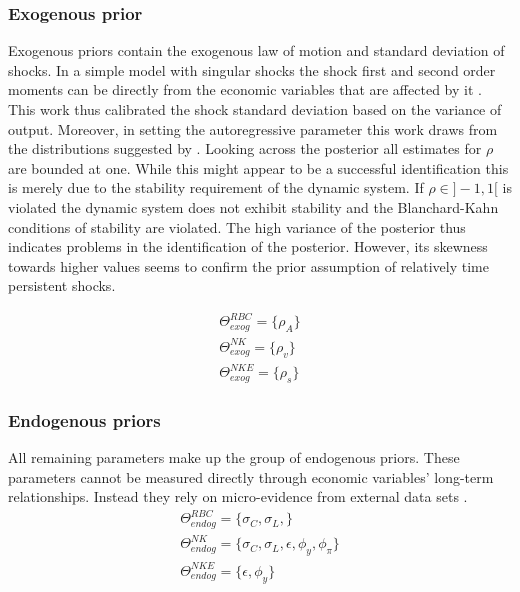 \documentclass[12pt,a4paper,english]{article} %
\begin{document}
	\subsubsection{Exogenous prior}
	Exogenous priors contain the exogenous law of motion and standard deviation of shocks. In a simple model with singular shocks the shock first and second order moments can be directly from the economic variables that are affected by it \cite{del_negro_forming_2008}. This work thus calibrated the shock standard deviation based on the variance of output. Moreover, in setting the autoregressive parameter this work draws from the distributions suggested by \cite{vasconez_what_nodate}. Looking across the posterior all estimates for $\rho$ are bounded at one. While this might appear to be a successful identification this is merely due to the stability requirement of the dynamic system. If $\rho \in ]-1,1[$ is violated the dynamic system does not exhibit stability and the Blanchard-Kahn conditions of stability are violated. The high variance of the posterior thus indicates problems in the identification of the posterior. However, its skewness towards higher values seems to confirm the prior assumption of relatively time persistent shocks. 
	
	\begin{equation}
		\begin{aligned}
			\Theta_{exog}^{RBC} = \{\rho_A \} \\
			\Theta_{exog}^{NK} = \{\rho_v \} \\
			\Theta_{exog}^{NKE} = \{\rho_s \}
		\end{aligned}
	\end{equation}

	\subsubsection{Endogenous priors}
	All remaining parameters make up the group of endogenous priors. These parameters cannot be measured directly through economic variables' long-term relationships. Instead they rely on micro-evidence from external data sets \cite{del_negro_forming_2008}. 
		\begin{equation}
		\begin{aligned}
			\Theta_{endog}^{RBC} = \{\sigma_C, \sigma_L, \} \\
			\Theta_{endog}^{NK} = \{\sigma_C, \sigma_L, \epsilon, \phi_{y}, \phi_{\pi} \} \\
			\Theta_{endog}^{NKE} = \{\epsilon, \phi_{y}\}
		\end{aligned}
	\end{equation}
	
\end{document}
